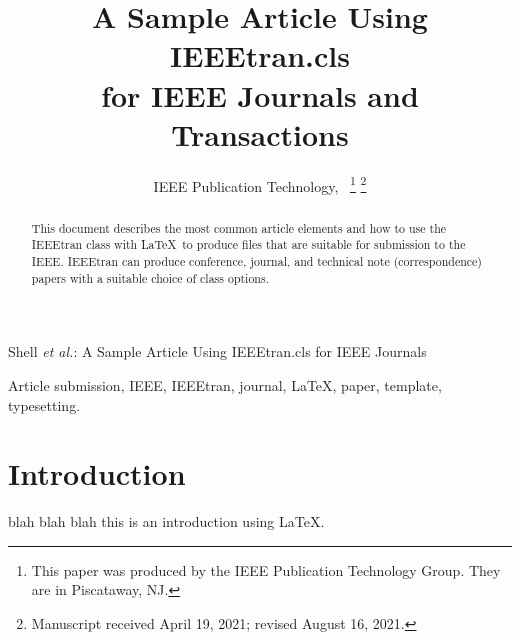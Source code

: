 \documentclass[lettersize,journal]{IEEEtran}
\begin{document}
\title{A Sample Article Using IEEEtran.cls\\ for IEEE Journals and Transactions}

\author{IEEE Publication Technology,~
\thanks{This paper was produced by the IEEE Publication Technology Group. They are in Piscataway, NJ.}%
\thanks{Manuscript received April 19, 2021; revised August 16, 2021.}}

%
{Shell \MakeLowercase{\textit{et al.}}: A Sample Article Using IEEEtran.cls for IEEE Journals}


\maketitle

\begin{abstract}
This document describes the most common article elements and how to use the IEEEtran class with \LaTeX \ to produce files that are suitable for submission to the IEEE.  IEEEtran can produce conference, journal, and technical note (correspondence) papers with a suitable choice of class options. 
\end{abstract}

\begin{IEEEkeywords}
Article submission, IEEE, IEEEtran, journal, \LaTeX, paper, template, typesetting.
\end{IEEEkeywords}

\section{Introduction}
 blah blah blah this is an introduction using \LaTeX.
\end{document}
